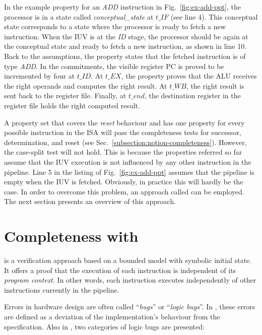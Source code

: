 In the example property for an \textit{ADD} instruction in Fig.~\ref{fig:ex-add-ppt}, the processor is in a state called \textit{conceptual\_state} at $t\_IF$ (see line 4). This conceptual state corresponds to a state where the processor is ready to fetch a new instruction. When the IUV is at the \textit{ID} stage, the processor should be again at the conceptual state and ready to fetch a new instruction, as shown in line 10. Back to the assumptions, the property states that the fetched instruction is of type \textit{ADD}. In the commitments, the visible register PC is proved to be incremented by four at $t\_ID$. At $t\_EX$, the property proves that the ALU receives the right operands and computes the right result. At $t\_WB$, the right result is sent back to the register file. Finally, at $t\_end$, the destination register in the register file holds the right computed result.

A property set that covers the \textit{reset} behaviour and has one property for every possible instruction in the ISA will pass the completeness tests for successor, determination, and reset (see Sec.~\ref{subsection:notion-completeness}). However, the case-split test will not hold. This is because the properties referred so far assume that the IUV execution is not influenced by any other instruction in the pipeline. Line 5 in the listing of Fig.~\ref{fig:ex-add-ppt} assumes that the pipeline is empty when the IUV is fetched. Obviously, in practice this will hardly be the case. In order to overcome this problem, an approach called \SSQED{} \cite{paper-symbolic} can be employed. The next section presents an overview of this approach.

\section{Completeness with \SSQED{}}
\label{section:s2qed}

\SSQED{} \cite{paper-symbolic} is a verification approach based on a bounded model with symbolic initial state. It offers a proof that the execution of each instruction is independent of its \textit{program context}. In other words, each instruction executes independently of other instructions currently in the pipeline. 

Errors in hardware design are often called “\textit{bugs}” or “\textit{logic bugs}”. In \cite{paper-gapfree}, these errors are defined as a deviation of the implementation’s behaviour from the specification. Also in \cite{paper-gapfree}, two categories of logic bugs are presented:

